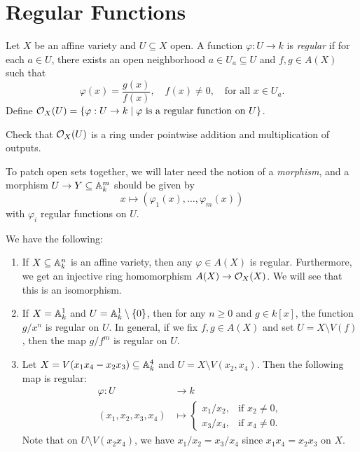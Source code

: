 \section{Regular Functions}

\begin{definition}
  Let $X$ be an affine variety and
  $U \subseteq X$ open. A function
  $\varphi : U \to k$ is \emph{regular} if
  for each $a \in U$, there exists an
  open neighborhood $a \in U_a \subseteq U$
  and $f, g \in A(X)$ such that
  \[
    \varphi(x) = \frac{g(x)}{f(x)},
    \quad f(x) \ne 0,
    \quad \text{for all } x \in U_a.
  \]
  Define $\mathcal{O}_X(U) = \{\varphi : U \to k \mid \varphi \text{ is a regular function on } U\}$.
\end{definition}

\begin{exercise}
  Check that $\mathcal{O}_X(U)$ is a
  ring under pointwise addition and
  multiplication of outputs.
\end{exercise}

\begin{remark}
  To patch open sets together, we will
  later need the notion of a \emph{morphism},
  and
  a morphism $U \to Y \subseteq \mathbb{A}_k^m$
  should be given by
  \[
    x \longmapsto (\varphi_1(x), \dots, \varphi_m(x))
  \]
  with $\varphi_i$ regular functions on $U$.
\end{remark}

\begin{example}
  We have the following:
  \begin{enumerate}
    \item If $X \subseteq \mathbb{A}_k^n$
      is an affine variety, then any
      $\varphi \in A(X)$ is regular.
      Furthermore, we get an injective ring homomorphism
      $A(X) \to \mathcal{O}_X(X)$. We will see that
      this is an isomorphism.
    \item If $X = \mathbb{A}_k^1$ and
      $U = \mathbb{A}_k^1 \setminus \{0\}$,
      then for any $n \ge 0$ and
      $g \in k[x]$, the function
      $g / x^n$ is regular on $U$.
      In general, if we fix
      $f, g \in A(X)$ and set $U = X \setminus V(f)$,
      then the map $g / f^m$
      is regular on $U$.
    \item Let $X = V(x_1x_4 - x_2 x_3) \subseteq \mathbb{A}_k^4$ and
      $U = X \setminus V(x_2, x_4)$.
      Then the following map is regular:
      \begin{align*}
        \varphi : U &\longrightarrow k \\
        (x_1, x_2, x_3, x_4) &\longmapsto
        \begin{cases}
          x_1 / x_2, & \text{if } x_2 \ne 0, \\
          x_3 / x_4, & \text{if } x_4 \ne 0.
        \end{cases}
      \end{align*}
      Note that on $U \setminus V(x_2 x_4)$,
      we have $x_1 / x_2 = x_3 / x_4$ since
      $x_1 x_4 = x_2 x_3$ on $X$.
  \end{enumerate}
\end{example}
